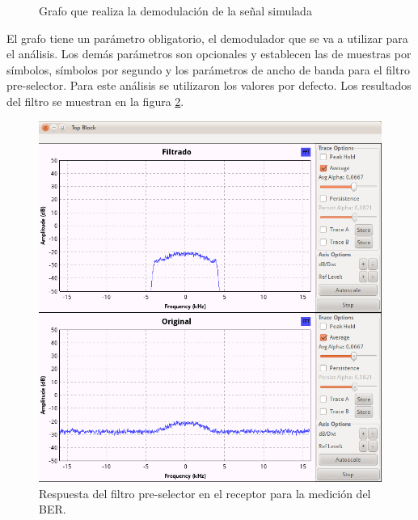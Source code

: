 \begin{figure}[htp]
  \centering
  \vspace{0.3in}
  \vspace{0.3in}
  \caption{Grafo que realiza la demodulaci\'on de la se\~nal simulada}
  \label{fig:analizer}
\end{figure}

El grafo tiene un par\'ametro obligatorio, el demodulador que se va a utilizar para el an\'alisis.
Los dem\'as par\'ametros son opcionales y establecen las de muestras por s\'imbolos, s\'imbolos
por segundo y los par\'ametros de ancho de banda para el filtro pre-selector. Para este an\'alisis
se utilizaron los valores por defecto. Los resultados del filtro se muestran en la figura
\ref{fig:predetect}.

\begin{figure}[htp]
  \centering
  \includegraphics[scale=0.5]{figs/predetectfilter}
  \vspace{0.3in}
  \caption{Respuesta del filtro pre-selector en el receptor para la medici\'on del BER.}
  \label{fig:predetect}
\end{figure}

